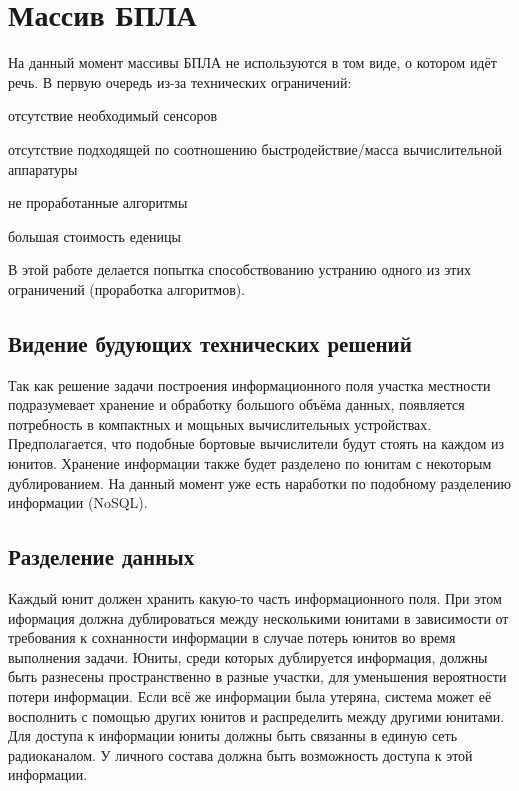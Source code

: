 \newpage
\section{Массив БПЛА}

На данный момент массивы БПЛА не используются в том виде,
о котором идёт речь. В первую очередь из-за технических
ограничений: 
\begin{mintemize}
    \item отсутствие необходимый сенсоров
    \item отсутствие подходящей по соотношению быстродействие/масса
        вычислительной аппаратуры
    \item не проработанные алгоритмы
    \item большая стоимость еденицы
\end{mintemize}

В этой работе делается попытка способствованию
устранию одного из этих ограничений (проработка алгоритмов).

\subsection{Видение будующих технических решений}

Так как решение задачи построения информационного поля
участка местности подразумевает хранение и обработку большого объёма
данных, появляется потребность в компактных и мощьных вычислительных
устройствах. Предполагается, что подобные бортовые вычислители будут
стоять на каждом из юнитов. Хранение информации также будет
разделено по юнитам с некоторым дублированием. На данный момент уже
есть наработки по подобному разделению информации (NoSQL).

\subsection{Разделение данных}

Каждый юнит должен хранить какую-то часть информационного поля.
При этом иформация должна дублироваться между несколькими юнитами в
зависимости от требования к сохнанности информации в случае потерь
юнитов во время выполнения задачи. Юниты, среди которых дублируется
информация, должны быть разнесены пространственно в разные участки,
для уменьшения вероятности потери информации. Если всё же информации
была утеряна, система может её восполнить с помощью других юнитов и 
распределить между другими юнитами. Для доступа к информации юниты
должны быть связанны в единую сеть радиоканалом. У личного состава
должна быть возможность доступа к этой информации. 

